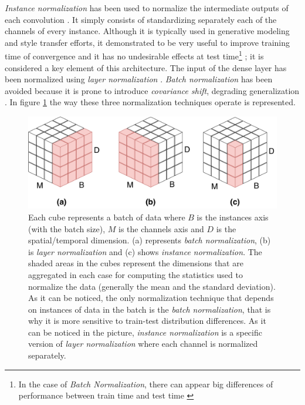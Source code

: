 \textit{Instance normalization}  has been used to normalize the intermediate outputs of each convolution \autocite{Ulyanov2016, Zheng2018}. It simply consists of standardizing separately each of the channels of every instance. Although it is typically used in generative modeling and style transfer efforts, it demonstrated to be very useful to improve training time of convergence and it has no undesirable effects at test time\footnote{In the case of \textit{Batch Normalization}, there can appear big differences of performance between train time and test time \autocite{Ba2016}} \autocite{Ulyanov2016}; it is considered a key element of this architecture. The input of the dense layer has been normalized using \textit{layer normalization} \autocite{Ba2016}. \textit{Batch normalization} \autocite{ioffe2015} has been avoided because it is prone to introduce \textit{covariance shift}, degrading generalization \autocite{Ba2016}. In figure \ref{fig:normcubes} the way these three normalization techniques operate is represented.



\begin{figure}[ht]
	\centering
	\includegraphics[width=0.7\linewidth]{kws/images/normcubes}
	\caption[Batch, instance and layer normalization diagrams]{Each cube represents a batch of data where $B$ is the instances axis (with the batch size), $M$ is the channels axis and $D$ is the spatial/temporal dimension. (a) represents \textit{batch normalization}, (b) is \textit{layer normalization} and (c) shows \textit{instance normalization}. The shaded areas in the cubes represent the dimensions that are aggregated in each case for computing the statistics used to normalize the data (generally the mean and the standard deviation). As it can be noticed, the only normalization technique that depends on instances of data in the batch is the \textit{batch normalization}, that is why it is more sensitive to train-test distribution differences. As it can be noticed in the picture, \textit{instance normalization} is a specific version of \textit{layer normalization} where each channel is normalized separately.}
	\label{fig:normcubes}
\end{figure}




